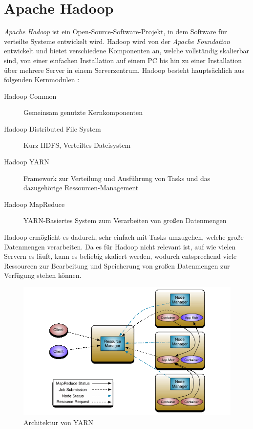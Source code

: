 \section{Apache Hadoop}\label{sec:hadoop}

\emph{Apache Hadoop} ist ein Open-Source-Software-Projekt, in dem Software für verteilte Systeme entwickelt wird. Hadoop wird von der \emph{Apache Foundation} entwickelt und bietet verschiedene Komponenten an, welche vollständig skalierbar sind, von einer einfachen Installation auf einem PC bis hin zu einer Installation über mehrere Server in einem Serverzentrum. Hadoop besteht hauptsächlich aus folgenden Kernmodulen \cite{HadoopHomePage}:

\begin{description}
	\item[Hadoop Common] Gemeinsam genutzte Kernkomponenten
	\item[Hadoop Distributed File System] Kurz HDFS, Verteiltes Dateisystem
	\item[Hadoop YARN] Framework zur Verteilung und Ausführung von Tasks und das dazugehörige Ressourcen-Management
	\item[Hadoop MapReduce] YARN-Basiertes System zum Verarbeiten von großen Datenmengen
\end{description}

Hadoop ermöglicht es dadurch, sehr einfach mit Tasks umzugehen, welche große Datenmengen verarbeiten. Da es für Hadoop nicht relevant ist, auf wie vielen Servern es läuft, kann es beliebig skaliert werden, wodurch entsprechend viele Ressourcen zur Bearbeitung und Speicherung von großen Datenmengen zur Verfügung stehen können.

\begin{figure}
	\centering
	\includegraphics[width=\columnwidth]{./images/yarn_architecture.png}
	\caption[Architektur von YARN]{Architektur von YARN \cite{HadoopYarnDesc272}}
	\label{fig:yarnarch}
\end{figure}

